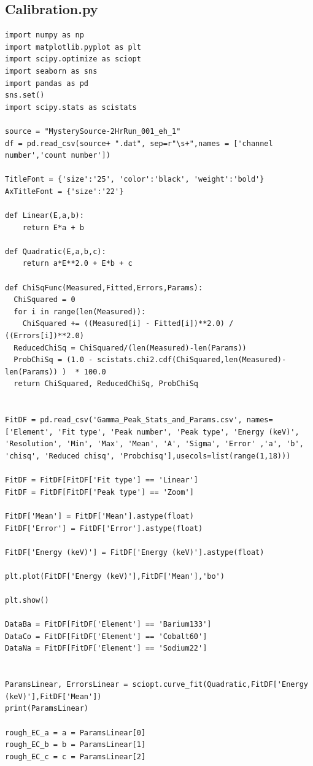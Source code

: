 \documentclass[11pt,a4paper]{article}
\begin{document}
\clearpage
\subsection{Calibration.py}

\begin{verbatim}
import numpy as np
import matplotlib.pyplot as plt
import scipy.optimize as sciopt
import seaborn as sns
import pandas as pd
sns.set()
import scipy.stats as scistats

source = "MysterySource-2HrRun_001_eh_1"
df = pd.read_csv(source+ ".dat", sep=r"\s+",names = ['channel number','count number'])

TitleFont = {'size':'25', 'color':'black', 'weight':'bold'} 
AxTitleFont = {'size':'22'}

def Linear(E,a,b):
    return E*a + b

def Quadratic(E,a,b,c):
    return a*E**2.0 + E*b + c

def ChiSqFunc(Measured,Fitted,Errors,Params):
  ChiSquared = 0
  for i in range(len(Measured)):
    ChiSquared += ((Measured[i] - Fitted[i])**2.0) / ((Errors[i])**2.0)
  ReducedChiSq = ChiSquared/(len(Measured)-len(Params))
  ProbChiSq = (1.0 - scistats.chi2.cdf(ChiSquared,len(Measured)-len(Params)) )  * 100.0
  return ChiSquared, ReducedChiSq, ProbChiSq


FitDF = pd.read_csv('Gamma_Peak_Stats_and_Params.csv', names=['Element', 'Fit type', 'Peak number',	'Peak type', 'Energy (keV)', 'Resolution', 'Min', 'Max', 'Mean', 'A', 'Sigma', 'Error' ,'a', 'b', 'chisq', 'Reduced chisq', 'Probchisq'],usecols=list(range(1,18)))

FitDF = FitDF[FitDF['Fit type'] == 'Linear']
FitDF = FitDF[FitDF['Peak type'] == 'Zoom']

FitDF['Mean'] = FitDF['Mean'].astype(float)
FitDF['Error'] = FitDF['Error'].astype(float)

FitDF['Energy (keV)'] = FitDF['Energy (keV)'].astype(float)

plt.plot(FitDF['Energy (keV)'],FitDF['Mean'],'bo')

plt.show()

DataBa = FitDF[FitDF['Element'] == 'Barium133']
DataCo = FitDF[FitDF['Element'] == 'Cobalt60']
DataNa = FitDF[FitDF['Element'] == 'Sodium22']


ParamsLinear, ErrorsLinear = sciopt.curve_fit(Quadratic,FitDF['Energy (keV)'],FitDF['Mean'])
print(ParamsLinear)

rough_EC_a = a = ParamsLinear[0]
rough_EC_b = b = ParamsLinear[1]
rough_EC_c = c = ParamsLinear[2]



\end{verbatim}
\end{document}
